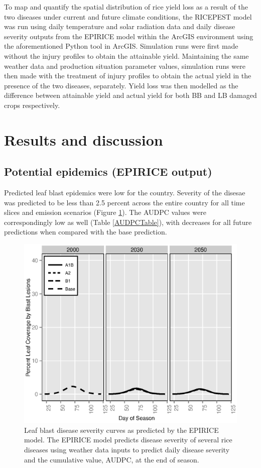 \documentclass[preprint,12pt]{elsarticle}
\begin{document}
To map and quantify the spatial distribution of rice yield loss as a result of the two diseases under current and future climate conditions, the RICEPEST model was run using daily temperature and solar radiation data and daily disease severity outputs from the EPIRICE model within the ArcGIS environment using the aforementioned Python tool in ArcGIS. Simulation runs were first made without the injury profiles to obtain the attainable yield. Maintaining the same weather data and production situation parameter values, simulation runs were then made with the treatment of injury profiles to obtain the actual yield in the presence of the two diseases, separately. Yield loss was then modelled as the difference between attainable yield and actual yield for both BB and LB damaged crops respectively.

\section{Results and discussion}

\subsection{Potential epidemics (EPIRICE output)}
Predicted leaf blast epidemics were low for the country. Severity of the disesae was predicted to be less than 2.5 percent across the entire country for all time slices and emission scenarios (Figure \ref{LBCurves}). The AUDPC values were correspondingly low as well (Table \ref{AUDPCTable}), with decreases for all future predictions when compared with the base prediction.

\begin{figure}[H]
  \includegraphics[width = 140mm]{figures/LB}
  \caption{Leaf blast disease severity curves as predicted by the EPIRICE model. The EPIRICE model predicts disease severity of several rice diseases using weather data inputs to predict daily disease severity and the cumulative value, AUDPC, at the end of season.}
    \label{LBCurves}
\end{figure}
\end{document}
